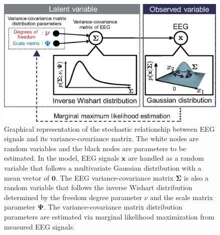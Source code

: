 \documentclass[journal]{IEEEtran}
\begin{document}
\begin{figure}[!t]
\centering
\includegraphics[width=1.0\hsize]{figure/fig1_ver2.eps}
\caption{Graphical representation of the stochastic relationship between EEG signals  and its variance-covariance matrix.
The white nodes are random variables and the black nodes are parameters to be estimated.
In the model, EEG signals $\mathbf{x}$ are handled as a random variable that follows a multivariate Gaussian distribution with a mean vector of $\mathbf{0}$.
The EEG variance-covariance matrix $\mathbf{\Sigma}$ is also a random variable that follows the inverse Wishart distribution determined by the freedom degree parameter $\nu$ and the scale matrix parameter $\mathbf{\Psi}$.
The variance-covariance matrix distribution parameters are estimated via marginal likelihood maximization from measured EEG signals.}
\label{fig:model}
\end{figure}
\end{document}
